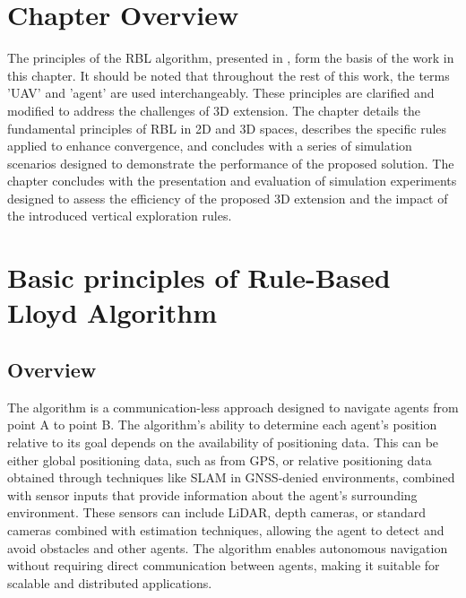 
\section{Chapter Overview}
    The principles of the \ac{RBL} algorithm, presented in \cite{rbl_paper}, form the basis of the work in this chapter. 
    It should be noted that throughout the rest of this work, the terms '\ac{UAV}' and 'agent' are used interchangeably.
    These principles are clarified and modified to address the challenges of 3D extension.  
    The chapter details the fundamental principles of \ac{RBL} in 2D and 3D spaces, describes the specific rules applied to enhance convergence, and concludes with a series of simulation scenarios designed to demonstrate the performance of the proposed solution.
    The chapter concludes with the presentation and evaluation of simulation experiments designed to assess the efficiency of the proposed 3D extension and the impact of the introduced vertical exploration rules.

\section{Basic principles of Rule-Based Lloyd Algorithm}

    \subsection{Overview}        
        The algorithm is a communication-less approach designed to navigate agents from point A to point B. 
        The algorithm's ability to determine each agent's position relative to its goal depends on the availability of positioning data. 
        This can be either global positioning data, such as from \ac{GPS}, or relative positioning data obtained through techniques like \ac{SLAM} in \ac{GNSS}-denied environments, combined with sensor inputs that provide information about the agent's surrounding environment.
        These sensors can include \ac{LiDAR}, depth cameras, or standard cameras combined with estimation techniques, allowing the agent to detect and avoid obstacles and other agents. 
        The algorithm enables autonomous navigation without requiring direct communication between agents, making it suitable for scalable and distributed applications.


